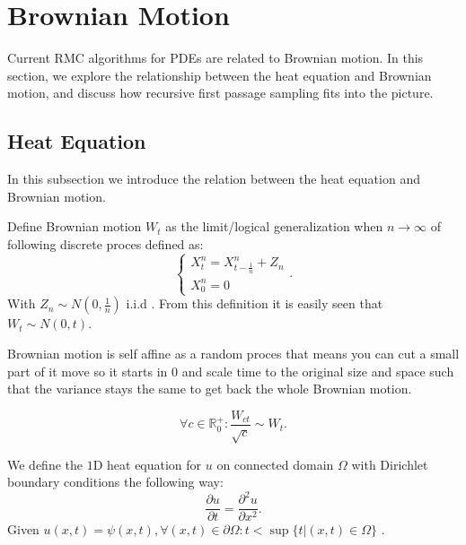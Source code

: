 \documentclass[a4paper,12pt]{article}
\begin{document}
\begin{pythonn}
\end{pythonn}


\section{Brownian Motion}

Current RMC algorithms for PDEs are related to Brownian motion. In this section,
we explore the relationship between the heat equation and Brownian motion,
and discuss how recursive first passage sampling  fits into the picture.


\subsection{Heat Equation}
In this subsection we introduce the relation between the heat equation and
Brownian motion.

\begin{definition}
    Define Brownian motion $W_{t}$ as the limit/logical generalization
    when $n \rightarrow \infty$ of following discrete proces defined as:
    \begin{equation}
        \begin{cases}
            X_{t}^{n} = X_{t-\frac{1}{n}}^{n} + Z_{n} \\
            X^{n}_{0}=0
        \end{cases}.
    \end{equation}
    With $Z_{n}\sim N(0,\frac{1}{n})$ i.i.d . From this definition it is easily seen that
    $W_{t} \sim N(0,t)$.
\end{definition}


\begin{lemma} \label{lem:self affine}
    Brownian motion is self affine as a random proces that means you can cut a small
    part of it move so it starts in $0$ and scale time to the original size
    and space such that the variance stays the same to get back the whole Brownian motion.

    \begin{equation}
        \forall c \in \mathbb{R}^{+}_{0}: \frac{W_{ct}}{\sqrt{c}} \sim W_{t}.
    \end{equation}
\end{lemma}

\begin{definition} \label{def:heat equation}
    We define the $1$D heat equation for $u$ on connected domain $\Omega$
    with  Dirichlet boundary conditions the following way:
    \begin{equation}
        \frac{\partial u}{\partial t} = \frac{\partial^{2} u}{\partial x ^{2}}.
    \end{equation}
    Given $u(x,t)=\psi(x,t) ,\forall (x,t) \in \partial \Omega: t<\sup \{
        t| (x,t) \in \Omega\}$ .
\end{definition}
\end{document}

